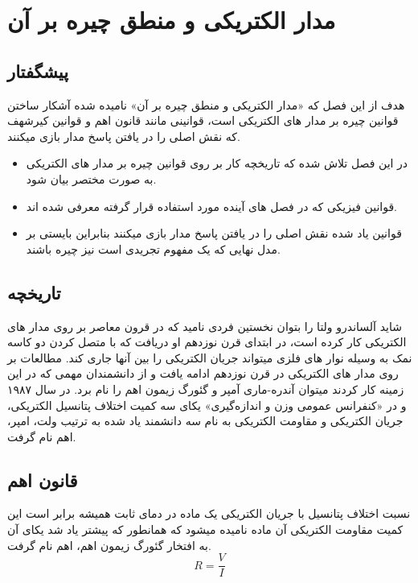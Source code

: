 \chapter{مدار الکتریکی و منطق چیره بر آن}
\section{پیشگفتار}
هدف از این فصل که «مدار الکتریکی و منطق چیره بر آن» نامیده شده آشکار ساختن قوانین چیره بر مدار های الکتریکی
است، قوانینی مانند قانون اهم
و قوانین کیرشهف
که نقش اصلی را در یافتن پاسخ مدار بازی میکنند.
\begin{itemize}
	\item
	در این فصل تلاش شده که تاریخچه کار بر روی قوانین چیره بر مدار های الکتریکی به صورت مختصر بیان شود.
	\item
	قوانین فیزیکی که در فصل های آینده مورد استفاده قرار گرفته معرفی شده اند.
	\item
	قوانین یاد شده نقش اصلی را در یافتن پاسخ مدار بازی میکنند بنابراین
	بایستی بر مدل نهایی که یک مفهوم تجریدی
	است نیز چیره باشند.
	
\end{itemize}

\section{تاریخچه}
شاید آلساندرو ولتا را بتوان نخستین فردی نامید که در قرون معاصر بر روی مدار های الکتریکی کار کرده است،
در ابتدای قرن نوزدهم او دریافت که با متصل کردن دو کاسه نمک به وسیله نوار های فلزی میتواند جریان الکتریکی را بین آنها جاری کند.
مطالعات بر روی مدار های الکتریکی در قرن نوزدهم ادامه یافت و از دانشمندان مهمی که در این زمینه کار کردند
میتوان آندره-ماری آمپر و گئورگ زیمون اهم را نام برد.
در سال ۱۹۸۷ و در «کنفرانس عمومی وزن و اندازه‌گیری» یکای سه کمیت اختلاف پتانسیل الکتریکی، جریان الکتریکی و مقاومت الکتریکی به نام سه دانشمند یاد شده به ترتیب ولت، امپر، اهم نام گرفت.
\section{قانون اهم}
\label{formula}

نسبت اختلاف پتانسیل با جریان الکتریکی یک ماده در دمای ثابت همیشه برابر است این کمیت مقاومت الکتریکی آن ماده نامیده میشود که همانطور که پیشتر یاد شد یکای آن به افتخار گئورگ زیمون اهم، اهم نام گرفت.
\begin{equation}\label{eq:ohm}
	R=\frac{V}{I}
\end{equation}

